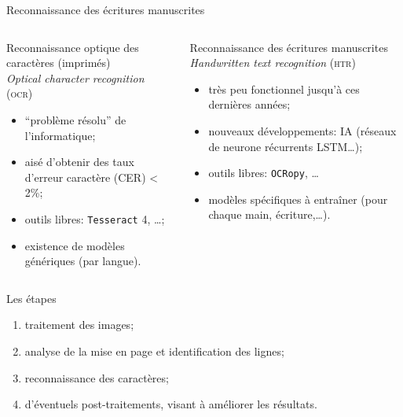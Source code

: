 \documentclass[ignorenonframetext]{beamer}
\begin{document}
\begin{frame}{Reconnaissance des écritures manuscrites}

\begin{columns}
\begin{column}{0.48\textwidth}
	Reconnaissance optique des caractères (imprimés)\\
	\textit{Optical character recognition} (\textsc{ocr})
	\begin{itemize}
		\item ``problème résolu'' de l'informatique;
		\item aisé d'obtenir des taux d'erreur caractère (CER) < 2\%;
		\item outils libres: \texttt{Tesseract} 4, …;
		\item existence de modèles génériques (par langue).
	\end{itemize}
\end{column}
\begin{column}{0.48\textwidth}
	Reconnaissance des écritures manuscrites\\
	\textit{Handwritten text recognition} (\textsc{htr})
	\begin{itemize}
		\item très peu fonctionnel jusqu'à ces dernières années;
		\item nouveaux développements: IA (réseaux de neurone récurrents LSTM…);
		\item outils libres: \texttt{OCRopy}, …
		\item modèles spécifiques à entraîner (pour chaque main, écriture,…).
	\end{itemize}
\end{column}
\end{columns}

\end{frame}




\begin{frame}{Les étapes}
\begin{enumerate}
\item traitement des images;
\item analyse de la mise en page et identification des lignes;
\item reconnaissance des caractères;
\item d'éventuels post-traitements, visant à améliorer les résultats.
\end{enumerate}
\end{frame}
\end{document}
